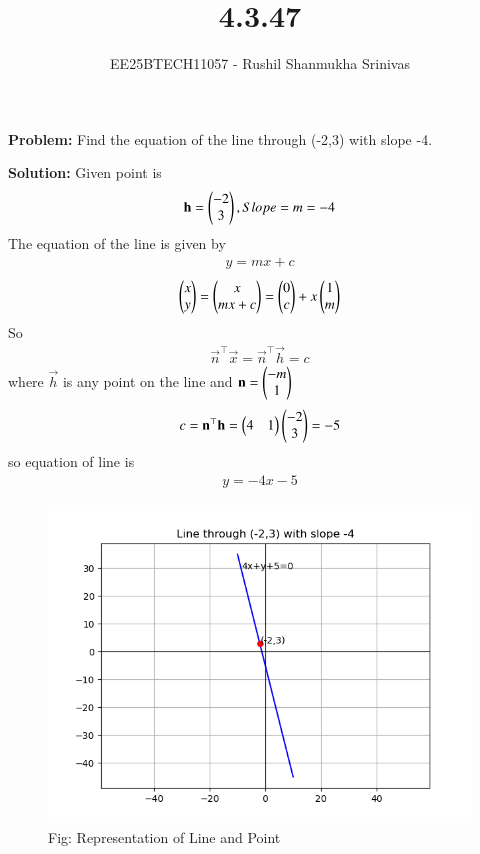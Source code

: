 \documentclass[journal]{IEEEtran}
\begin{document}




\title{4.3.47}
\author{EE25BTECH11057 - Rushil Shanmukha Srinivas
}
{\let\newpage\relax\maketitle}

\renewcommand{\thefigure}{\theenumi}
\renewcommand{\thetable}{\theenumi}
\setlength{\intextsep}{10pt} %

\renewcommand{\thetable}{\theenumi}

\textbf{Problem:} Find the equation of the line through (-2,3) with slope -4.

\textbf{Solution:}
Given point is 
\begin{align}
\mathbf{h}=\begin{pmatrix}-2\\3\end{pmatrix} , Slope=m=-4
\end{align}
The equation of the line is given by
\begin{align}
y=mx+c
\end{align}
\begin{align}
\begin{pmatrix}x\\y\end{pmatrix} = \begin{pmatrix}x\\mx+c\end{pmatrix}=\begin{pmatrix}0\\c\end{pmatrix} + x\begin{pmatrix}1\\m\end{pmatrix}
\end{align}
So
\begin{align}
\vec{n}^\top \vec{x} = \vec{n}^\top \vec{h} =c
\end{align}
 where $\vec{h}$ is any point on the line and $\mathbf{n}=\begin{pmatrix}-m\\1\end{pmatrix} $
\begin{align}
c = \mathbf{n}^\top \mathbf{h} = \begin{pmatrix}4 & 1\end{pmatrix}\begin{pmatrix}-2\\3\end{pmatrix} = -5
\end{align}
so equation of line is 
\begin{align}
y=-4x -5 
\end{align}
 
\begin{figure}[h!]
  \centering
  \includegraphics[width=0.9\columnwidth]{figs/fig6.png} 
   \caption*{Fig: Representation of Line and Point}
  \label{Fig6}
\end{figure}
\end{document}
